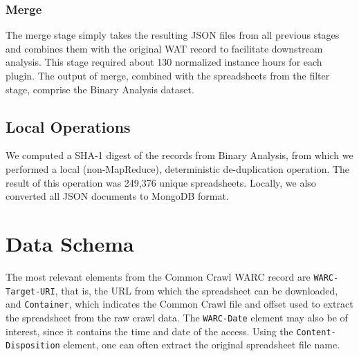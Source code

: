 \documentclass[conference]{IEEEtran}
\begin{document}
\subsubsection{Merge} 

The merge stage simply takes the resulting JSON files from all previous stages and combines them with the original WAT record to facilitate downstream analysis. This stage required about 130 normalized instance hours for each plugin. The output of merge, combined with the spreadsheets from the filter stage, comprise the Binary Analysis dataset.

\subsection{Local Operations}


We computed a SHA-1 digest of the records from Binary Analysis, from which we performed a local (non-MapReduce), deterministic de-duplication operation. The result of this operation was 249,376 unique spreadsheets. Locally, we also converted all JSON documents to MongoDB format.







\section{Data Schema}
\label{sec:schema}


The most relevant elements from the Common Crawl WARC record are \texttt{WARC-Target-URI}, that is, the URL from which the spreadsheet can be downloaded, and \texttt{Container}, which indicates the Common Crawl file and offset used to extract the spreadsheet from the raw crawl data. The \texttt{WARC-Date} element may also be of interest, since it contains the time and date of the access. Using the \texttt{Content-Disposition} element, one can often extract the original spreadsheet file name.
\end{document}
